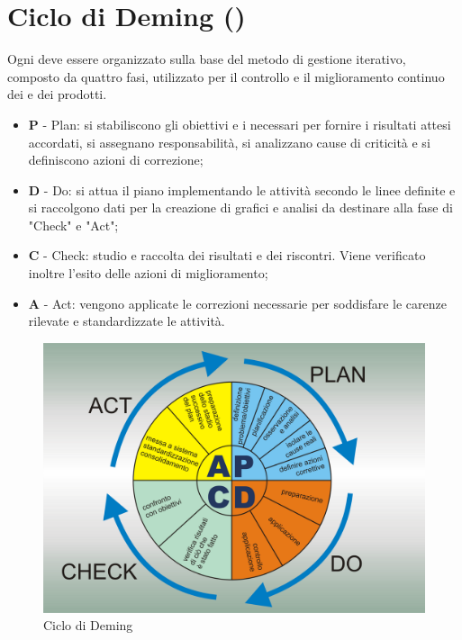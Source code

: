 \clearpage
\appendix
\section{Ciclo di Deming ()}
Ogni  deve essere organizzato sulla base del metodo di gestione iterativo, composto da quattro fasi, utilizzato per il controllo e il miglioramento continuo dei  e dei prodotti.
\begin{itemize}
	\item \textbf{P} - Plan: si stabiliscono gli obiettivi e i  necessari per fornire i risultati attesi accordati, si assegnano responsabilità, si analizzano cause di criticità e si definiscono azioni di correzione;
	\item \textbf{D} - Do: si attua il piano implementando le attività secondo le linee definite e si raccolgono dati per la creazione di grafici e analisi da destinare alla fase di "Check" e "Act";
	\item \textbf{C} - Check: studio e raccolta dei risultati e dei riscontri. Viene verificato inoltre l'esito delle azioni di miglioramento;
	\item \textbf{A}  - Act: vengono applicate le correzioni necessarie per soddisfare le carenze rilevate e standardizzate le attività.
\end{itemize}
\begin{figure}[h]
	\includegraphics[width=1\textwidth]{../includes/pics/PDCA.png}
	\caption{Ciclo di Deming }
\end{figure}
\clearpage
